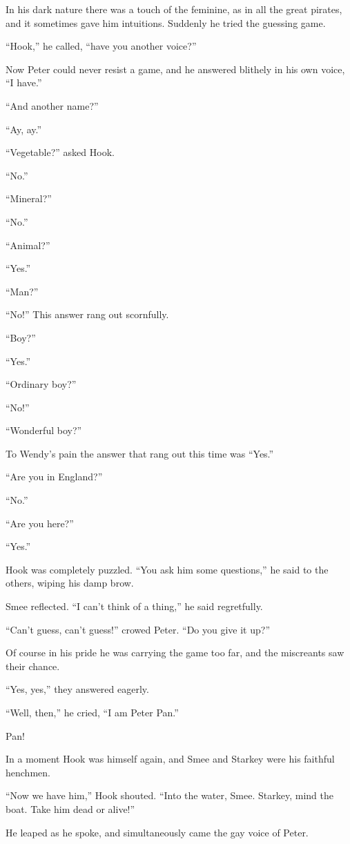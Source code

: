 In his dark nature there was a touch of the feminine, as in all the
great pirates, and it sometimes gave him intuitions. Suddenly he tried
the guessing game.

``Hook,'' he called, ``have you another voice?''

Now Peter could never resist a game, and he answered blithely in his
own voice, ``I have.''

``And another name?''

``Ay, ay.''

``Vegetable?'' asked Hook.

``No.''

``Mineral?''

``No.''

``Animal?''

``Yes.''

``Man?''

``No!'' This answer rang out scornfully.

``Boy?''

``Yes.''

``Ordinary boy?''

``No!''

``Wonderful boy?''

To Wendy's pain the answer that rang out this time was ``Yes.''

``Are you in England?''

``No.''

``Are you here?''

``Yes.''

Hook was completely puzzled. ``You ask him some questions,'' he said to
the others, wiping his damp brow.

Smee reflected. ``I can't think of a thing,'' he said regretfully.

``Can't guess, can't guess!'' crowed Peter. ``Do you give it up?''

Of course in his pride he was carrying the game too far, and the
miscreants saw their chance.

``Yes, yes,'' they answered eagerly.

``Well, then,'' he cried, ``I am Peter Pan.''

Pan!

In a moment Hook was himself again, and Smee and Starkey were his
faithful henchmen.

``Now we have him,'' Hook shouted. ``Into the water, Smee. Starkey, mind
the boat. Take him dead or alive!''

He leaped as he spoke, and simultaneously came the gay voice of Peter.

